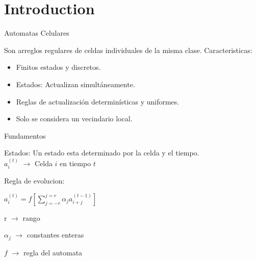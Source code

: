 \section{Introduction}

\begin{frame}{Automatas Celulares}
    \begin{block}{Son arreglos regulares de celdas individuales de la misma clase.}
        Caracteristicas:
        \begin{itemize}
            \item Finitos estados y discretos.
            \item Estados: Actualizan simultáneamente.
            \item Reglas de actualización determinísticas y uniformes.
            \item Solo se considera un vecindario local.
        \end{itemize}
    \end{block}
\end{frame}

\begin{frame}{Fundamentos}
    \begin{block}{Estados:}
        Un estado esta determinado por la celda y el tiempo.
        \\
        $a_{i}^{(t)}$ $\longrightarrow$ Celda $i$ en tiempo $t$

    \end{block}
    \begin{block}{Regla de evolucion:}

        \vspace{1em}

        $a_{i}^{(t)} = f \left[ \sum_{j=-r}^{j=r}  \alpha_{j} a_{i+j}^{(t-1)} \right]$

        \begin{multicols}{3}
            r $\rightarrow$ rango

            $\alpha_j$ $\rightarrow$ constantes enteras

            $f$ $\rightarrow$ regla del automata
        \end{multicols}

    \end{block}
\end{frame}

